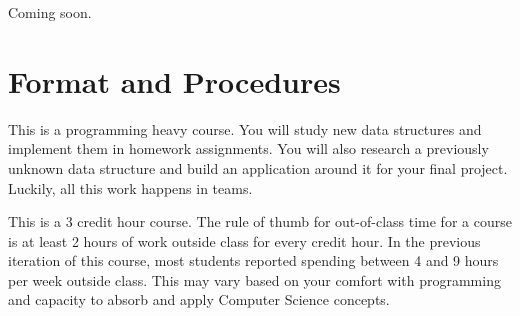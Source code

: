 \documentclass[a4paper]{article}
\begin{document}
Coming soon.



\section{Format and Procedures}

This is a programming heavy course. You will study new data structures and implement them in homework assignments. You will also research a previously unknown data structure and build an application around it for your final project. Luckily, all this work happens in teams.

This is a 3 credit hour course. The rule of thumb for out-of-class time for a course is at least 2 hours of work outside class for every credit hour. In the previous iteration of this course, most students reported spending between 4 and 9 hours per week outside class. This may vary based on your comfort with programming and capacity to absorb and apply Computer Science concepts.
\end{document}
